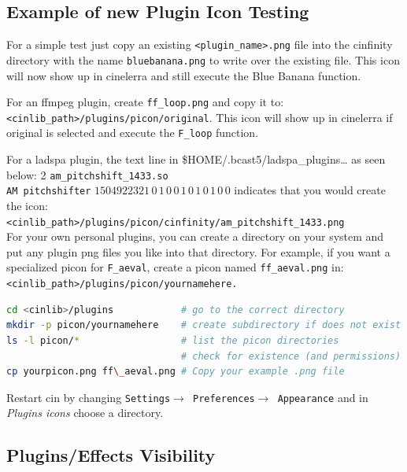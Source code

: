 \subsection{Example of new Plugin Icon Testing}%
\label{sub:example_plugin_icon_testing}

For a simple test just copy an existing \texttt{<plugin\_name>.png} file into the cinfinity directory with the name \texttt{bluebanana.png} to write over the existing file. This icon will now show up in cinelerra and still execute the Blue Banana function.

For an ffmpeg plugin, create \texttt{ff\_loop.png} and copy it to: \\
\texttt{<cinlib\_path>/plugins/picon/original}. This icon will show up in cinelerra if original is selected and execute the \texttt{F\_loop} function.

For a ladspa plugin, the text line in \$HOME/.bcast5/ladspa\_plugins… as seen below:
2 \texttt{am\_pitchshift\_1433.so} \\
\texttt{AM pitchshifter} $1504922321\, 0\, 1\, 0\, 0\, 1\, 0\, 1\, 0\, 1\, 0\, 0$ indicates that you would create the icon: \\ \texttt{<cinlib\_path>/plugins/picon/cinfinity/am\_pitchshift\_1433.png} \\
For your own personal plugins, you can create a directory on your system and put any plugin png files you like into that directory. For example, if you want a specialized picon for \texttt{F\_aeval}, create a picon named \texttt{ff\_aeval.png} in: \\ \texttt{<cinlib\_path>/plugins/picon/yournamehere.}

\begin{lstlisting}[language=Bash]
cd <cinlib>/plugins            # go to the correct directory
mkdir -p picon/yournamehere    # create subdirectory if does not exist
ls -l picon/*                  # list the picon directories
                               # check for existence (and permissions)
cp yourpicon.png ff\_aeval.png # Copy your example .png file
\end{lstlisting}

Restart cin by changing \texttt{Settings$\rightarrow$ Preferences$\rightarrow$ Appearance} and in \textit{Plugins icons} choose a directory.

\subsection{Plugins/Effects Visibility}%
\label{sub:plugins_effects_visibility}

